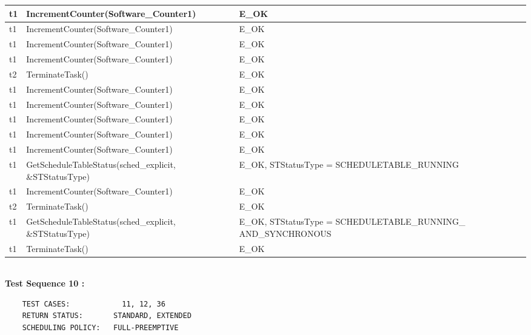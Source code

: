 \documentclass[10pt]{article}
\newlength{\Li}\settowidth{\Li}{Running}
\newlength{\Lii}\setlength{\Lii}{7cm}
\newlength{\Liiii}\setlength{\Liiii}{0.9cm}
\newlength{\Liii}\setlength{\Liii}{\textwidth} \addtolength{\Liii}{-\Li} \addtolength{\Liii}{-\Lii} \addtolength{\Liii}{-\Liiii}
\begin{document}
\begin{supertabular}{|p{\Li}|p{\Lii}|p{\Liii}|p{\Liiii}|}
	t1		& IncrementCounter(Software\_Counter1)						& E\_OK																	& \\ \hline
	t1		& IncrementCounter(Software\_Counter1)						& E\_OK																	& \\ \hline
	t1		& IncrementCounter(Software\_Counter1)						& E\_OK																	& \\ \hline
	t1		& IncrementCounter(Software\_Counter1)						& E\_OK																	& \\ \hline
	t2		& TerminateTask()											& E\_OK																	& \\ \hline
	t1		& IncrementCounter(Software\_Counter1)						& E\_OK																	& \\ \hline
	t1		& IncrementCounter(Software\_Counter1)						& E\_OK																	& \\ \hline
	t1		& IncrementCounter(Software\_Counter1)						& E\_OK																	& \\ \hline
	t1		& IncrementCounter(Software\_Counter1)						& E\_OK																	& \\ \hline
	t1		& IncrementCounter(Software\_Counter1)						& E\_OK																	& \\ \hline
	t1		& GetScheduleTableStatus(sched\_explicit, \&STStatusType)			& E\_OK, STStatusType = SCHEDULETABLE\_RUNNING 							& \\ \hline
	t1		& IncrementCounter(Software\_Counter1)						& E\_OK																	& \\ \hline
	t2		& TerminateTask()											& E\_OK																	& \\ \hline
	t1		& GetScheduleTableStatus(sched\_explicit, \&STStatusType)			& E\_OK, STStatusType = SCHEDULETABLE\_RUNNING\_ AND\_SYNCHRONOUS		& \\ \hline
	t1		& TerminateTask()											& E\_OK																	& \\ \hline	
	\end{supertabular}\\
	
	\textbf{Test Sequence 10 :}
	\begin{lstlisting}
	TEST CASES:		       11, 12, 36
	RETURN STATUS:	  	 STANDARD, EXTENDED
	SCHEDULING POLICY:   FULL-PREEMPTIVE
	\end{lstlisting}
	
	
\end{document}
